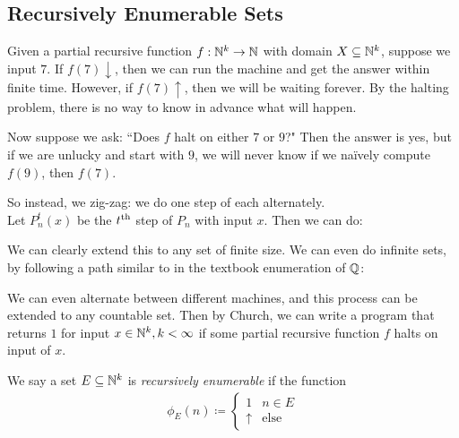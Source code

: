 \documentclass[10pt,a4paper]{article}
\begin{document}
\subsection*{Recursively Enumerable Sets}
Given a partial recursive function $f:\mathbb{N}^k \to \mathbb{N}$ with domain $X\subseteq \mathbb{N}^k$, suppose we input $7$. If $f(7)\downarrow$, then we can run the machine and get the answer within finite time. However, if $f(7)\uparrow$, then we will be waiting forever. By the halting problem, there is no way to know in advance what will happen.

Now suppose we ask: ``Does $f$ halt on either $7$ or $9$?" Then the answer is yes, but if we are unlucky and start with $9$, we will never know if we na\"ively compute $f(9)$, then $f(7)$. 

So instead, we zig-zag: we do one step of each alternately.\\
Let $P_n^t(x)$ be the $t\textsuperscript{th}$ step of $P_n$ with input $x$. Then we can do:
\begin{center}
\end{center}
We can clearly extend this to any set of finite size. We can even do infinite sets, by following a path similar to in the textbook enumeration of $\mathbb{Q}$:
\begin{center}
\end{center}
We can even alternate between different machines, and this process can be extended to any countable set. Then by Church, we can write a program that returns $1$ for input $x \in \mathbb{N}^k, k < \infty$ if some partial recursive function $f$ halts on input of $x$.

We say a set $E\subseteq \mathbb{N}^k$ is \emph{recursively enumerable} if the function
\begin{align*}
\phi_E(n) \coloneqq \begin{cases} 1 & n\in E \\ \uparrow&  \text{else}\end{cases}
\end{align*}
\end{document}
